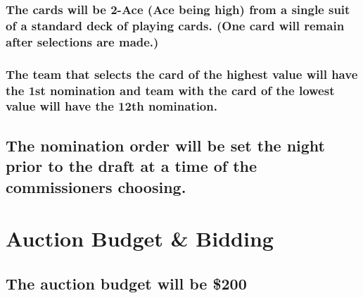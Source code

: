 \documentclass[]{book}
\begin{document}
\hypertarget{the-cards-will-be-2-ace-ace-being-high-from-a-single-suit-of-a-standard-deck-of-playing-cards.-one-card-will-remain-after-selections-are-made.}{%
\subsubsection{The cards will be 2-Ace (Ace being high) from a single suit of a standard deck of playing cards. (One card will remain after selections are made.)}\label{the-cards-will-be-2-ace-ace-being-high-from-a-single-suit-of-a-standard-deck-of-playing-cards.-one-card-will-remain-after-selections-are-made.}}

\hypertarget{the-team-that-selects-the-card-of-the-highest-value-will-have-the-1st-nomination-and-team-with-the-card-of-the-lowest-value-will-have-the-12th-nomination.}{%
\subsubsection{The team that selects the card of the highest value will have the 1st nomination and team with the card of the lowest value will have the 12th nomination.}\label{the-team-that-selects-the-card-of-the-highest-value-will-have-the-1st-nomination-and-team-with-the-card-of-the-lowest-value-will-have-the-12th-nomination.}}

\hypertarget{the-nomination-order-will-be-set-the-night-prior-to-the-draft-at-a-time-of-the-commissioners-choosing.}{%
\subsection{The nomination order will be set the night prior to the draft at a time of the commissioners choosing.}\label{the-nomination-order-will-be-set-the-night-prior-to-the-draft-at-a-time-of-the-commissioners-choosing.}}

\hypertarget{auction-budget-bidding}{%
\section{Auction Budget \& Bidding}\label{auction-budget-bidding}}

\hypertarget{the-auction-budget-will-be-200}{%
\subsection{The auction budget will be \$200}\label{the-auction-budget-will-be-200}}
\end{document}
